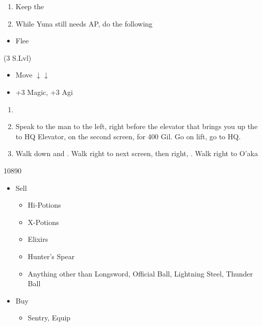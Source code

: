 \begin{enumerate}[resume]
  \item Keep the \formation{\kimahri}{\wakka}{\yuna}
  \item While Yuna still needs AP, do the following
\end{enumerate}
\begin{encounters}
  \begin{itemize}
    \wakkaf Attack Raptors or Gandarewas
    \yunaf Defend
    \item Flee
  \end{itemize}
\end{encounters}
\begin{spheregrid}
\begin{itemize}
\yunaf (3 S.Lvl)
\begin{itemize}
      \item Move $\downarrow\downarrow$
      \item +3 Magic, +3 Agi
      \end{itemize}
      \end{itemize}
\end{spheregrid}
\begin{enumerate}[resume]
  \item \formation{\tidus}{\yuna}{\wakka}
  \item Speak to the man to the left, right before the elevator that brings you up the to HQ Elevator, on the second screen, for 400 Gil. Go on lift, go to HQ.
  \item Walk down and \sd. Walk right to next screen, then right, \sd. Walk right to O'aka
\end{enumerate}
\begin{shop}{10890}
  \begin{itemize}
    \item Sell
          \begin{itemize}
            \item Hi-Potions
            \item X-Potions
            \item Elixirs
            \item Hunter's Spear
            \item Anything other than Longsword, Official Ball, Lightning Steel, Thunder Ball
          \end{itemize}
    \item Buy
          \begin{itemize}
            \item Sentry, Equip
          \end{itemize}
  \end{itemize}
\end{shop}
